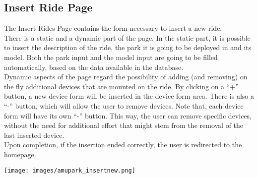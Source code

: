 \subsection{Insert Ride Page}
The Insert Rides Page contains the form necessary to insert a new ride.\\

There is a static and a dynamic part of the page. In the static part, it is possible to insert the description of the ride, the park it is going to be deployed in and its model. Both the park input and the model input are going to be filled automatically, based on the data available in the database.\\

Dynamic aspects of the page regard the possibility of adding (and removing) on the fly additional devices that are mounted on the ride. By clicking on a “+” button, a new device form will be inserted in the device form area. There is also a “-” button, which will allow the user to remove devices. Note that, each device form will have its own “-” button. This way, the user can remove specific devices, without the need for additional effort that might stem from the removal of the last inserted device.\\

Upon completion, if the insertion ended correctly, the user is redirected to the homepage.

\texttt{[image: images/amupark\_insertnew.png]}